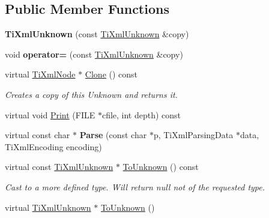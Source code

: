 \subsection*{Public Member Functions}
\begin{DoxyCompactItemize}
\item 
\hypertarget{class_ti_xml_unknown_abe798ff4feea31474850c7f0de6bdf5e}{
{\bfseries TiXmlUnknown} (const \hyperlink{class_ti_xml_unknown}{TiXmlUnknown} \&copy)}
\label{class_ti_xml_unknown_abe798ff4feea31474850c7f0de6bdf5e}

\item 
\hypertarget{class_ti_xml_unknown_a5097fe228cd5ad4edcdddf02c334fd83}{
void {\bfseries operator=} (const \hyperlink{class_ti_xml_unknown}{TiXmlUnknown} \&copy)}
\label{class_ti_xml_unknown_a5097fe228cd5ad4edcdddf02c334fd83}

\item 
\hypertarget{class_ti_xml_unknown_a0960bb7428b3f341da46244229604d73}{
virtual \hyperlink{class_ti_xml_node}{TiXmlNode} $\ast$ \hyperlink{class_ti_xml_unknown_a0960bb7428b3f341da46244229604d73}{Clone} () const }
\label{class_ti_xml_unknown_a0960bb7428b3f341da46244229604d73}

\begin{DoxyCompactList}\small\item\em Creates a copy of this Unknown and returns it. \item\end{DoxyCompactList}\item 
virtual void \hyperlink{class_ti_xml_unknown_a31ba089a40fb5a1869750fce09b0bacb}{Print} (FILE $\ast$cfile, int depth) const 
\item 
\hypertarget{class_ti_xml_unknown_a0d0a0f8ec748f12bd1dc3ef6d64d7c87}{
virtual const char $\ast$ {\bfseries Parse} (const char $\ast$p, TiXmlParsingData $\ast$data, TiXmlEncoding encoding)}
\label{class_ti_xml_unknown_a0d0a0f8ec748f12bd1dc3ef6d64d7c87}

\item 
\hypertarget{class_ti_xml_unknown_ab0313e5fe77987d746ac1a97a254419d}{
virtual const \hyperlink{class_ti_xml_unknown}{TiXmlUnknown} $\ast$ \hyperlink{class_ti_xml_unknown_ab0313e5fe77987d746ac1a97a254419d}{ToUnknown} () const }
\label{class_ti_xml_unknown_ab0313e5fe77987d746ac1a97a254419d}

\begin{DoxyCompactList}\small\item\em Cast to a more defined type. Will return null not of the requested type. \item\end{DoxyCompactList}\item 
\hypertarget{class_ti_xml_unknown_a67c9fd22940e8c47f706a72cdd2e332c}{
virtual \hyperlink{class_ti_xml_unknown}{TiXmlUnknown} $\ast$ \hyperlink{class_ti_xml_unknown_a67c9fd22940e8c47f706a72cdd2e332c}{ToUnknown} ()}
\label{class_ti_xml_unknown_a67c9fd22940e8c47f706a72cdd2e332c}


\end{DoxyCompactItemize}
